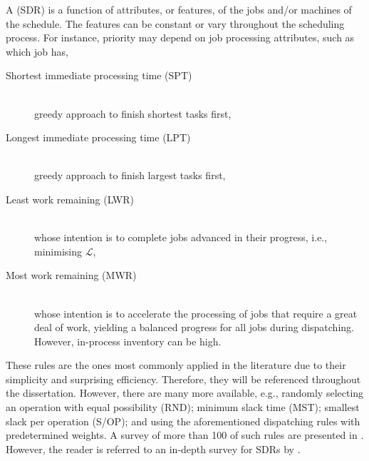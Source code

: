 A \emph{\sdr} (SDR) is a function of attributes, or features, of the jobs 
and/or machines of the schedule. The features can be constant or vary 
throughout the scheduling process. 
For instance, priority may depend on job processing attributes, such as 
which job has, 
\begin{description}
    \item[Shortest immediate processing time (SPT)] \hfill \\
    greedy approach to finish shortest tasks first,  
    \item[Longest immediate processing time (LPT)] \hfill \\
    greedy approach to finish largest tasks first, 
    \item[Least work remaining (LWR)] \hfill \\
    whose intention is to complete jobs advanced in their pro\-gress, i.e., 
    minimising $\mathcal{L}$,
    \item[Most work remaining (MWR)] \hfill \\
    whose intention is to accelerate the processing of jobs that require a 
    great deal of work, yielding a balanced progress for all jobs during 
    dispatching. However, in-process inventory can be high.
\end{description}
These rules are the ones most commonly applied in the literature due to their 
simplicity and surprising efficiency. %
Therefore, they will be referenced throughout the dissertation. 
However, there are many more available, e.g., randomly selecting an operation 
with equal possibility (RND); minimum slack time (MST); smallest slack per 
operation (S/OP); and using the aforementioned dispatching rules with 
predetermined weights. 
A survey of more than 100 of such rules are presented in \citet{Panwalkar77}. 
However, the reader is referred to an in-depth survey for SDRs by 
\citet{Haupt89}. 



